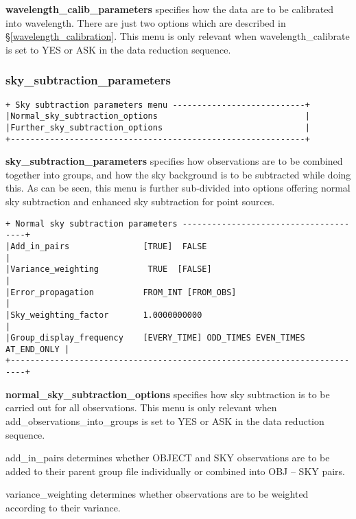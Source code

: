 {{\bf wavelength\_calib\_parameters} specifies how the 
data are to be calibrated into wavelength. There are just two options
which are described in \S \ref{wavelength_calibration}.
This menu is only relevant when {\sf wavelength\_calibrate} 
is set to {\sf YES} or {\sf ASK} in the data reduction sequence.

\subsubsection{sky\_subtraction\_parameters} 
\label{sky_subtraction_parameters} 
\begin{verbatim}
+ Sky subtraction parameters menu ---------------------------+
|Normal_sky_subtraction_options                              |
|Further_sky_subtraction_options                             |
+------------------------------------------------------------+
\end{verbatim}

{\bf sky\_subtraction\_parameters} specifies how observations are to be 
combined together into groups, and how the sky background is to be 
subtracted while doing this. 
As can be seen, this menu is further sub-divided into options offering normal
sky subtraction and enhanced sky subtraction for point sources.

\begin{verbatim}
+ Normal sky subtraction parameters --------------------------------------+
|Add_in_pairs               [TRUE]  FALSE                                 |
|Variance_weighting          TRUE  [FALSE]                                |
|Error_propagation          FROM_INT [FROM_OBS]                           |
|Sky_weighting_factor       1.0000000000                                  |
|Group_display_frequency    [EVERY_TIME] ODD_TIMES EVEN_TIMES AT_END_ONLY |
+-------------------------------------------------------------------------+
\end{verbatim}
{\bf normal\_sky\_subtraction\_options} \label{normal_sky_subtraction_options}
specifies how sky subtraction is to be carried out for all observations. 
This menu is only relevant when {\sf add\_observations\_into\_groups} is set 
to {\sf YES} or {\sf ASK} in the data reduction sequence.

{\sf add\_in\_pairs} determines whether {\sf OBJECT} and {\sf SKY} 
observations are to be added to their parent group file individually or 
combined into {\sf OBJ -- SKY} pairs.

{\sf variance\_weighting} determines whether observations are to be 
weighted according to their variance.

}
